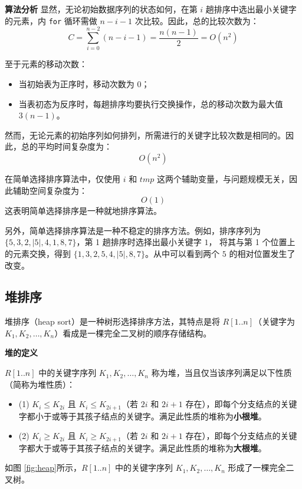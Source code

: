 \documentclass[lang=cn,newtx,10pt,scheme=chinese]{../elegantbook}
\begin{document}
\textbf{算法分析}
显然，无论初始数据序列的状态如何，在第 $i$ 趟排序中选出最小关键字的元素，内 \texttt{for} 循环需做 $n - i - 1$ 次比较。因此，总的比较次数为：
\[
C = \sum_{i=0}^{n-2} (n - i - 1) = \frac{n(n-1)}{2} = O(n^2)
\]

至于元素的移动次数：

\begin{itemize}
  \item 当初始表为正序时，移动次数为 $0$；
  \item 当表初态为反序时，每趟排序均要执行交换操作，总的移动次数为最大值 $3(n-1)$。
\end{itemize}

然而，无论元素的初始序列如何排列，所需进行的关键字比较次数是相同的。因此，总的平均时间复杂度为：
\[
O(n^2)
\]

在简单选择排序算法中，仅使用 $i$ 和 $tmp$ 这两个辅助变量，与问题规模无关，因此辅助空间复杂度为：
\[
O(1)
\]
这表明简单选择排序是一种就地排序算法。

另外，简单选择排序算法是一种不稳定的排序方法。例如，排序序列为 $\{5, 3, 2, |5|, 4, 1, 8, 7\}$，第 1 趟排序时选择出最小关键字 $1$，
将其与第 1 个位置上的元素交换，得到 $\{1, 3, 2, 5, 4, |5|, 8, 7\}$。从中可以看到两个 $5$ 的相对位置发生了改变。





\subsection{堆排序}

堆排序（heap sort）是一种树形选择排序方法，其特点是将 $R[1..n]$（关键字为 $K_1, K_2, \dots, K_n$）看成是一棵完全二叉树的顺序存储结构。


\textbf{堆的定义}  

$R[1..n]$ 中的关键字序列 $K_1, K_2, \dots, K_n$ 称为堆，当且仅当该序列满足以下性质（简称为堆性质）：
\begin{itemize}
  \item (1) $K_i \leq K_{2i}$ 且 $K_i \leq K_{2i+1}$（若 $2i$ 和 $2i+1$ 存在），即每个分支结点的关键字都小于或等于其孩子结点的关键字。满足此性质的堆称为\textbf{小根堆}。
  \item (2) $K_i \geq K_{2i}$ 且 $K_i \geq K_{2i+1}$（若 $2i$ 和 $2i+1$ 存在），即每个分支结点的关键字都大于或等于其孩子结点的关键字。满足此性质的堆称为\textbf{大根堆}。
\end{itemize}

如图 \ref{fig:heap}所示，$R[1..n]$ 中的关键字序列 $K_1, K_2, \dots, K_n$ 形成了一棵完全二叉树。
\end{document}

